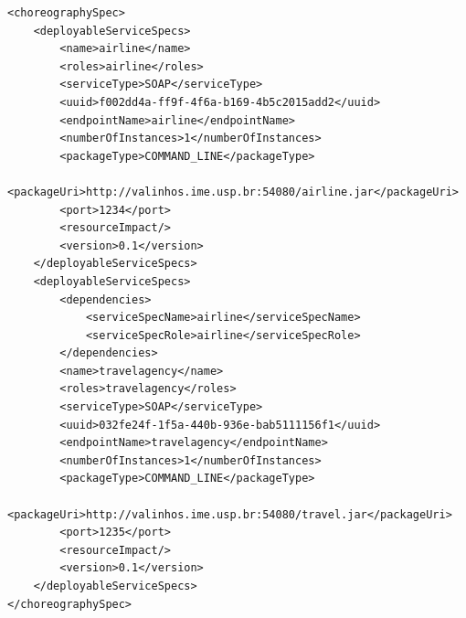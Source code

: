 \documentclass[a4paper, 10pt]{article}
\begin{document}
{\footnotesize

\lstset{language=XML}

\begin{lstlisting}[caption=ChorSpec XML representation example, label=lst:chor_spec_xml]
<choreographySpec>
    <deployableServiceSpecs>
        <name>airline</name>
        <roles>airline</roles>
        <serviceType>SOAP</serviceType>
        <uuid>f002dd4a-ff9f-4f6a-b169-4b5c2015add2</uuid>
        <endpointName>airline</endpointName>
        <numberOfInstances>1</numberOfInstances>
        <packageType>COMMAND_LINE</packageType>
        <packageUri>http://valinhos.ime.usp.br:54080/airline.jar</packageUri>
        <port>1234</port>
        <resourceImpact/>
        <version>0.1</version>
    </deployableServiceSpecs>
    <deployableServiceSpecs>
        <dependencies>
            <serviceSpecName>airline</serviceSpecName>
            <serviceSpecRole>airline</serviceSpecRole>
        </dependencies>
        <name>travelagency</name>
        <roles>travelagency</roles>
        <serviceType>SOAP</serviceType>
        <uuid>032fe24f-1f5a-440b-936e-bab5111156f1</uuid>
        <endpointName>travelagency</endpointName>
        <numberOfInstances>1</numberOfInstances>
        <packageType>COMMAND_LINE</packageType>
        <packageUri>http://valinhos.ime.usp.br:54080/travel.jar</packageUri>
        <port>1235</port>
        <resourceImpact/>
        <version>0.1</version>
    </deployableServiceSpecs>
</choreographySpec>
\end{lstlisting}

}
\end{document}
